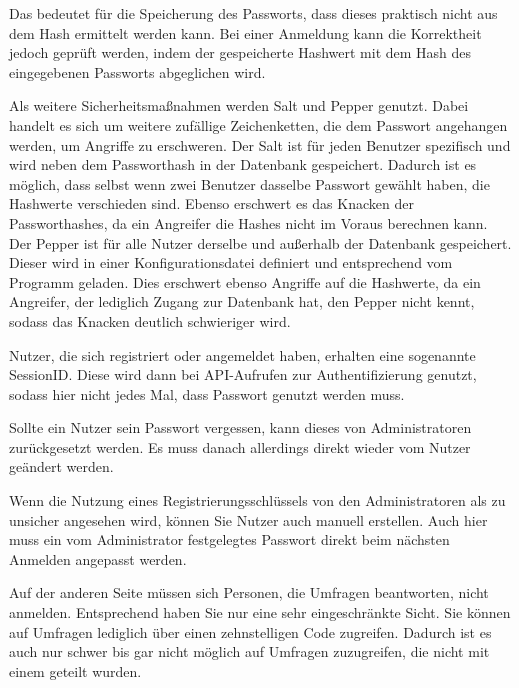 Das bedeutet für die Speicherung des Passworts, dass dieses praktisch nicht aus dem Hash ermittelt werden kann.
Bei einer Anmeldung kann die Korrektheit jedoch geprüft werden, indem der gespeicherte Hashwert mit dem Hash des eingegebenen Passworts abgeglichen wird.

Als weitere Sicherheitsmaßnahmen werden Salt und Pepper genutzt.
Dabei handelt es sich um weitere zufällige Zeichenketten, die dem Passwort angehangen werden, um Angriffe zu erschweren.
Der Salt ist für jeden Benutzer spezifisch und wird neben dem Passworthash in der Datenbank gespeichert.
Dadurch ist es möglich, dass selbst wenn zwei Benutzer dasselbe Passwort gewählt haben, die Hashwerte verschieden sind.
Ebenso erschwert es das Knacken der Passworthashes, da ein Angreifer die Hashes nicht im Voraus berechnen kann.
Der Pepper ist für alle Nutzer derselbe und außerhalb der Datenbank gespeichert.
Dieser wird in einer Konfigurationsdatei definiert und entsprechend vom Programm geladen.
Dies erschwert ebenso Angriffe auf die Hashwerte, da ein Angreifer, der lediglich Zugang zur Datenbank hat, den Pepper nicht kennt, sodass das Knacken deutlich schwieriger wird.

Nutzer, die sich registriert oder angemeldet haben, erhalten eine sogenannte SessionID.
Diese wird dann bei \acs{API}-Aufrufen zur Authentifizierung genutzt, sodass hier nicht jedes Mal, dass Passwort genutzt werden muss.

Sollte ein Nutzer sein Passwort vergessen, kann dieses von Administratoren zurückgesetzt werden.
Es muss danach allerdings direkt wieder vom Nutzer geändert werden.

Wenn die Nutzung eines Registrierungsschlüssels von den Administratoren als zu unsicher angesehen wird, können Sie Nutzer auch manuell erstellen.
Auch hier muss ein vom Administrator festgelegtes Passwort direkt beim nächsten Anmelden angepasst werden.

Auf der anderen Seite müssen sich Personen, die Umfragen beantworten, nicht anmelden.
Entsprechend haben Sie nur eine sehr eingeschränkte Sicht.
Sie können auf Umfragen lediglich über einen zehnstelligen Code zugreifen.
Dadurch ist es auch nur schwer bis gar nicht möglich auf Umfragen zuzugreifen, die nicht mit einem geteilt wurden.
